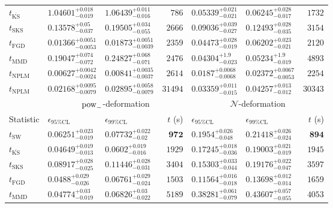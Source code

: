 \begin{tabular}{l|llr|llr}
	$t_{\overline{\mathrm{KS}}}$ & $1.04601_{-0.019}^{+0.018}$ & $1.06439_{-0.016}^{+0.011}$ & $786$ & $0.05339_{-0.021}^{+0.021}$ & $0.06245_{-0.017}^{+0.028}$ & $1732$ \\
	$t_{\mathrm{SKS}}$ & $0.13578_{-0.037}^{+0.05}$ & $0.19505_{-0.055}^{+0.034}$ & $2666$ & $0.09036_{-0.027}^{+0.039}$ & $0.12493_{-0.035}^{+0.028}$ & $3154$ \\
	$t_{\mathrm{FGD}}$ & ${\mathbf{0.01366_{-0.0053}^{+0.0051}}}$ & ${\mathbf{0.01873_{-0.0039}^{+0.0051}}}$ & $2359$ & $0.04473_{-0.019}^{+0.028}$ & $0.06202_{-0.021}^{+0.023}$ & $2120$ \\
	$t_{\mathrm{MMD}}$ & $0.19047_{-0.072}^{+0.074}$ & $0.24827_{-0.071}^{+0.068}$ & $2476$ & ${\mathbf{0.04304_{-0.023}^{+1.9}}}$ & ${\mathbf{0.05234_{-0.019}^{+1.9}}}$ & $4893$ \\
\rowcolor{red!35}	$t_{\mathrm{NPLM}}$ & $0.00627_{-0.0024}^{+0.0042}$ & $0.00841_{-0.0037}^{+0.0035}$ & $2614$ & $0.0187_{-0.0068}^{+0.0068}$ & $0.02372_{-0.0053}^{+0.0067}$ & $2254$ \\
\rowcolor{blue!35}	$t_{\mathrm{NPLM}}$ & $0.02168_{-0.0079}^{+0.0095}$ & $0.02895_{-0.0079}^{+0.0058}$ & $31494$ & $0.03359_{-0.015}^{+0.011}$ & $0.04257_{-0.012}^{+0.013}$ & $30343$ \\
	\toprule
	\multicolumn{1}{c}{} & \multicolumn{3}{c}{$\rm{pow}_{-}$-deformation} & \multicolumn{3}{c}{$\mathcal{N}$-deformation} \\
Statistic & $\epsilon_{95\%\mathrm{CL}}$ & $\epsilon_{99\%\mathrm{CL}}$ & $t$ (s) & $\epsilon_{95\%\mathrm{CL}}$ & $\epsilon_{99\%\mathrm{CL}}$ & $t$ (s) \\
	\midrule
	$t_{\mathrm{SW}}$ & $0.06251_{-0.019}^{+0.023}$ & $0.07732_{-0.02}^{+0.022}$ & ${\mathbf{972}}$ & $0.1954_{-0.048}^{+0.026}$ & $0.21418_{-0.024}^{+0.026}$ & ${\mathbf{894}}$ \\
	$t_{\overline{\mathrm{KS}}}$ & ${\mathbf{0.04649_{-0.013}^{+0.019}}}$ & ${\mathbf{0.0602_{-0.016}^{+0.019}}}$ & $1929$ & $0.17245_{-0.036}^{+0.018}$ & $0.19003_{-0.019}^{+0.021}$ & $1945$ \\
	$t_{\mathrm{SKS}}$ & $0.08917_{-0.025}^{+0.028}$ & $0.11446_{-0.031}^{+0.028}$ & $3404$ & $0.15303_{-0.044}^{+0.033}$ & $0.19176_{-0.047}^{+0.022}$ & $3597$ \\
	$t_{\mathrm{FGD}}$ & $0.0488_{-0.026}^{+0.029}$ & $0.06761_{-0.024}^{+0.029}$ & $1503$ & ${\mathbf{0.11564_{-0.018}^{+0.016}}}$ & ${\mathbf{0.13698_{-0.014}^{+0.012}}}$ & $1659$ \\
	$t_{\mathrm{MMD}}$ & $0.04774_{-0.019}^{+0.03}$ & $0.06826_{-0.022}^{+0.03}$ & $5189$ & $0.38281_{-0.079}^{+0.061}$ & $0.43607_{-0.055}^{+0.057}$ & $4053$ \\

\end{tabular}
